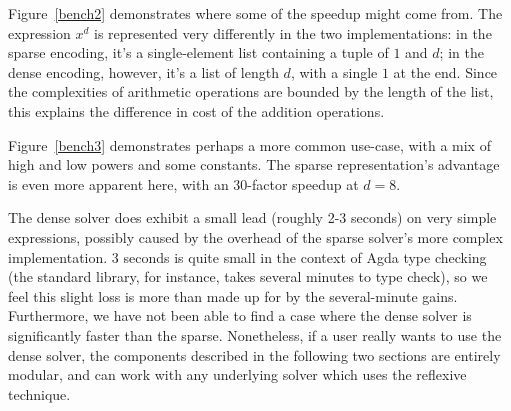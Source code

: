\documentclass[acmsmall,review,anonymous]{acmart}\settopmatter{printfolios=true,printccs=false,printacmref=false}
\begin{document}
Figure~\ref{bench2} demonstrates where some of the speedup might come
from. The expression \(x^d\) is represented very differently in the two
implementations: in the sparse encoding, it's a single-element list containing a
tuple of $1$ and $d$; in the dense encoding, however, it's a list of length $d$,
with a single $1$ at the end. Since the complexities of arithmetic operations
are bounded by the length of the list, this explains the difference in cost of
the addition operations.

Figure~\ref{bench3} demonstrates perhaps a more common use-case, with a mix of
high and low powers and some constants. The sparse representation's advantage is
even more apparent here, with an \(30\)-factor speedup at \(d = 8\).

The dense solver does exhibit a small lead (roughly 2-3 seconds) on very simple
expressions, possibly caused by the overhead of the sparse solver's more complex
implementation. 3 seconds is quite small in the context of Agda type checking
(the standard library, for instance, takes several minutes to type check), so we
feel this slight loss is more than made up for by the several-minute gains.
Furthermore, we have not been able to find a case where the dense solver is
significantly faster than the sparse. Nonetheless, if a user really wants to use
the dense solver, the components described in the following two sections are
entirely modular, and can work with any underlying solver which uses the
reflexive technique.
\end{document}
